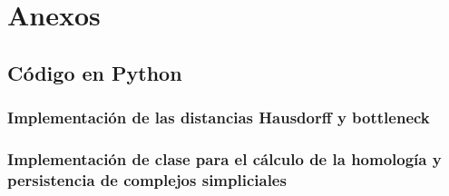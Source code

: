 \chapter*{Anexos}

\section{Código en Python}
\subsection{Implementación de las distancias Hausdorff y bottleneck}


\subsection{Implementación de clase para el cálculo de la homología y persistencia de complejos simpliciales}





 